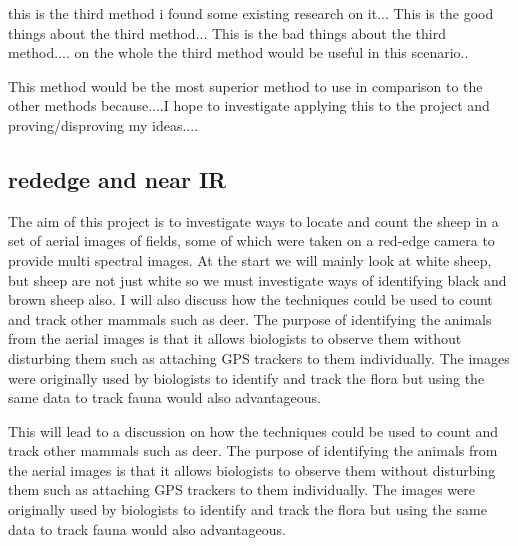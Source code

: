 this is the third method i found some existing research on it...
This is the good things about the third method...
This is the bad things about the third  method....
on the whole the third method would be useful in this scenario..

This method would be the most superior method to use in comparison to the other methods because....I hope to investigate applying this to the project and proving/disproving my ideas....

\subsection{rededge and near IR}
\begin{comment}
What was your background preparation for the project? What similar systems or research techniques did you assess? What was your motivation and interest in this project? 
\end{comment}
The aim of this project is to investigate ways to locate and count the sheep in a set of aerial images of fields, some of which were taken on a red-edge camera to provide multi spectral images. At the start we will mainly look at white sheep, but sheep are not just white so we must investigate ways of identifying black and brown sheep also. I will also discuss how the techniques could be used to count and track other mammals such as deer. The purpose of identifying the animals from the aerial images is that it allows biologists to observe them without disturbing them such as attaching GPS trackers to them individually. The images were originally used by biologists to identify and track the flora but using the same data to track fauna would also advantageous.

    
This will lead to a discussion on how the techniques could be used to count and track other mammals such as deer. The purpose of identifying the animals from the aerial images is that it allows biologists to observe them without disturbing them such as attaching GPS trackers to them individually. The images were originally used by biologists to identify and track the flora but using the same data to track fauna would also advantageous.

